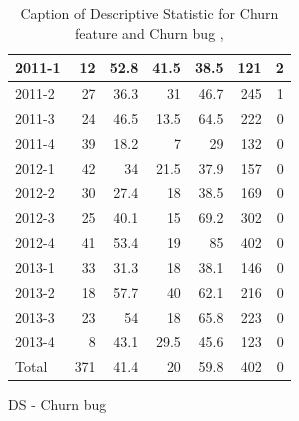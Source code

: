 \documentclass[UKenglish]{ifimaster}  %
\begin{document}
\begin{appendices}
\begin{table}[!htbp]
\begin{adjustwidth}{-2.5cm}{}
\begin{subfigure}[b]{0.7\textwidth}
{\begin{tabular}{ | l | r | r | r | r | r | r | }
 2011-1  & 12 & 52.8 & 41.5 & 38.5 & 121 & 2 \\ \hline
 2011-2  & 27 & 36.3 & 31 & 46.7 & 245 & 1 \\ \hline
 2011-3  & 24 & 46.5 & 13.5 & 64.5 & 222 & 0\\ \hline
 2011-4  & 39 & 18.2 & 7 & 29 & 132 & 0\\ \hline
 2012-1  & 42 & 34 & 21.5 & 37.9 & 157 & 0\\ \hline
 2012-2  & 30 & 27.4 & 18 & 38.5 & 169 & 0\\ \hline
 2012-3  & 25 & 40.1 & 15 & 69.2 & 302 & 0\\ \hline
 2012-4  & 41 & 53.4 & 19 & 85 & 402 & 0\\ \hline
 2013-1  & 33 & 31.3 & 18 & 38.1 & 146 & 0\\ \hline
 2013-2  & 18 & 57.7 & 40 & 62.1 & 216 & 0\\ \hline
 2013-3  & 23 & 54 & 18 & 65.8 & 223 & 0\\ \hline
 2013-4  & 8 & 43.1 & 29.5 & 45.6 & 123 & 0\\ \hline
 Total  & 371 & 41.4 & 20 & 59.8 & 402 & 0\\ \hline
\end{tabular}
}
\caption{DS - Churn bug}
 \label{DS:CB:3}
\end{subfigure}
\end{adjustwidth}
\caption[Optional caption for list of figures]{Caption of Descriptive Statistic for Churn feature and Churn bug , }
\label{DS:3:4}
\end{table}





\end{appendices}
\end{document}
